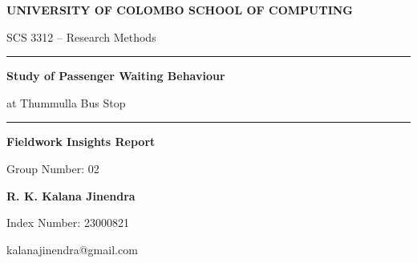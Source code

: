 \documentclass[12pt,a4paper]{report}
\begin{document}

\begin{titlepage}
    \thispagestyle{empty}

    \begin{center}

        \vspace*{0.8cm}

        {\Large\bfseries UNIVERSITY OF COLOMBO SCHOOL OF COMPUTING\par}

        \vspace{0.2cm}

        {\large SCS 3312 -- Research Methods\par}

        \vspace{1.4cm}

        \rule{0.78\textwidth}{0.5pt}\par

        \vspace{0.4cm}

        {\LARGE\bfseries Study of Passenger Waiting Behaviour\par}

        \vspace{0.2cm}

        {\Large at Thummulla Bus Stop\par}

        \vspace{0.4cm}

        \rule{0.78\textwidth}{0.5pt}\par

        \vspace{1cm}

        {\large\bfseries Fieldwork Insights Report\par}

        \vspace{0.2cm}

        {\large Group Number: 02\par}

        \vfill

        {\fontsize{18pt}{22pt}\selectfont\bfseries R. K. Kalana Jinendra\par}

        \vspace{0.2cm}

        {\large Index Number: 23000821\par}

        {\large kalanajinendra@gmail.com\par}

        \vspace{1cm}

    \end{center}

\end{titlepage}
\end{document}
